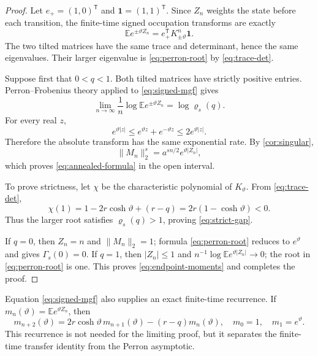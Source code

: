 \documentclass[11pt,a4paper]{amsart}
\theoremstyle{definition}
\theoremstyle{remark}
\newcommand{\Exp}{\mathbb E}
\newcommand{\one}{\mathbf 1}
\newcommand{\norm}[1]{\lVert #1\rVert}
\begin{document}
\begin{proof}
Let $e_+=(1,0)^{\mathsf T}$ and $\one=(1,1)^{\mathsf T}$.  Since $Z_n$
weights the state before each transition, the finite-time signed
occupation transforms are exactly
\begin{equation}\label{eq:signed-mgf}
 \Exp e^{\pm\vartheta Z_n}
 =e_+^{\mathsf T}K_{\pm\vartheta}^{n}\one.
\end{equation}
The two tilted matrices have the same trace and determinant, hence the
same eigenvalues.  Their larger eigenvalue is
\eqref{eq:perron-root} by \eqref{eq:trace-det}.

Suppose first that $0<q<1$.  Both tilted matrices have strictly positive
entries.  Perron--Frobenius theory applied to \eqref{eq:signed-mgf} gives
\[
 \lim_{n\to\infty}\frac1n\log \Exp e^{\pm\vartheta Z_n}
 =\log\varrho_s(q).
\]
For every real $z$,
\begin{equation}\label{eq:absolute-bound}
 e^{\vartheta|z|}
 \leq e^{\vartheta z}+e^{-\vartheta z}
 \leq2e^{\vartheta|z|}.
\end{equation}
Therefore the absolute transform has the same exponential rate.  By
\cref{cor:singular},
\[
 \norm{M_n}_2^s=a^{sn/2}e^{\vartheta|Z_n|},
\]
which proves \eqref{eq:annealed-formula} in the open interval.

To prove strictness, let $\chi$ be the characteristic polynomial of
$K_{\vartheta}$.  From \eqref{eq:trace-det},
\[
 \chi(1)=1-2r\cosh\vartheta+(r-q)
 =2r(1-\cosh\vartheta)<0.
\]
Thus the larger root satisfies $\varrho_s(q)>1$, proving
\eqref{eq:strict-gap}.

If $q=0$, then $Z_n=n$ and $\norm{M_n}_2=1$; formula
\eqref{eq:perron-root} reduces to $e^{\vartheta}$ and gives
$\Gamma_s(0)=0$.  If $q=1$, then $|Z_n|\leq1$ and
$n^{-1}\log\Exp e^{\vartheta|Z_n|}\to0$; the root in
\eqref{eq:perron-root} is one.  This proves
\eqref{eq:endpoint-moments} and completes the proof.
\end{proof}

Equation \eqref{eq:signed-mgf} also supplies an exact finite-time
recurrence.  If $m_n(\vartheta)=\Exp e^{\vartheta Z_n}$, then
\begin{equation}\label{eq:mgf-recurrence}
 m_{n+2}(\vartheta)=2r\cosh\vartheta\,m_{n+1}(\vartheta)
 -(r-q)m_n(\vartheta),
 \quad m_0=1,\quad m_1=e^{\vartheta}.
\end{equation}
This recurrence is not needed for the limiting proof, but it separates the
finite-time transfer identity from the Perron asymptotic.
\end{document}
